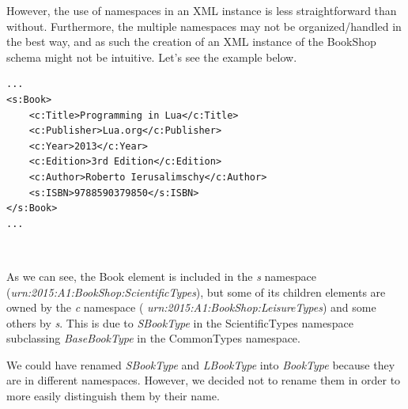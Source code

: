 However, the use of namespaces in an XML instance is less straightforward than
without. Furthermore, the multiple namespaces may not be organized/handled in
the best way, and as such the creation of an XML instance of the BookShop schema
might not be intuitive. Let's see the example below.\\

\begin{lstlisting}
...
<s:Book>
    <c:Title>Programming in Lua</c:Title>
    <c:Publisher>Lua.org</c:Publisher>
    <c:Year>2013</c:Year>
    <c:Edition>3rd Edition</c:Edition>
    <c:Author>Roberto Ierusalimschy</c:Author>
    <s:ISBN>9788590379850</s:ISBN>
</s:Book>
...
\end{lstlisting}
\

As we can see, the Book element is included in the \emph{s} namespace
(\emph{urn:2015:A1:BookShop:ScientificTypes}), but some of its
children elements are owned by the \emph{c} namespace (
\emph{urn:2015:A1:BookShop:LeisureTypes}) and some others by \emph{s}. This is
due to \emph{SBookType} in the ScientificTypes namespace subclassing
\emph{BaseBookType} in the CommonTypes namespace.\\

\begin{framehint}
We could have renamed \emph{SBookType} and \emph{LBookType} into \emph{BookType}
because they are in different namespaces. However, we decided not to rename them
in order to more easily distinguish them by their name.
\end{framehint}

\newpage
